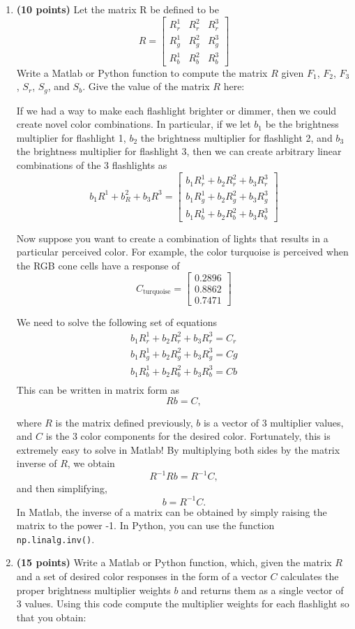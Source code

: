 \documentclass[10pt,letterpaper]{article}
\newcommand{\cmd}[1] {{\color{blue}\texttt{#1}}}
\begin{document}
\begin{enumerate}
\item \textbf{(10 points)} Let the matrix R be defined to be 
\[
	R = \left[ \begin{array}{ccc}
				R^1_r &  R^2_r & R^3_r\\
				R^1_g &  R^2_g & R^3_g\\
				R^1_b &  R^2_b & R^3_b\end{array} \right]
\]
Write a Matlab or Python function to compute the matrix $R$ given $F_1$, $F_2$, $F_3$, $S_r$, $S_g$, and $S_b$. Give the value of the matrix $R$ here:
\vspace{2in}

If we had a way to make each flashlight brighter or dimmer, then we could
create novel color combinations. In particular, if we let $b_1$ be the brightness
multiplier for flashlight 1, $b_2$ the brightness multiplier for flashlight 2, and $b_3$ the brightness multiplier for flashlight 3, then we can create arbitrary linear
combinations of the 3 flashlights as
\[
	b_1R^1 + b_R^2 + b_3R^3 = \left[ \begin{array}{c}
				b_1R^1_r + b_2R^2_r + b_3R^3_r\\
				b_1R^1_g + b_2R^2_g + b_3R^3_g\\				
				b_1R^1_b + b_2R^2_b + b_3R^3_b\end{array} \right]
\]

Now suppose you want to create a combination of lights that results in a
particular perceived color. For example, the color turquoise is perceived when
the RGB cone cells have a response of
\[
C_{\text{turquoise}} = \left[ \begin{array}{c} 0.2896 \\ 0.8862 \\ 0.7471 \end{array} \right]
\]

We need to solve the following set of equations
\begin{eqnarray*}
b_1R^1_r + b_2R^2_r + b_3R^3_r = C_r\\
b_1R^1_g + b_2R^2_g + b_3R^3_g = Cg \\
b_1R^1_b + b_2R^2_b + b_3R^3_b = Cb \\
\end{eqnarray*}
This can be written in matrix form as
\[ Rb = C, \]

where $R$ is the matrix defined previously, $b$ is a vector of 3 multiplier values, and $C$ is the 3 color components for the desired color. Fortunately, this is extremely easy to solve in Matlab! By multiplying both sides by the matrix inverse of $R$, we obtain
\[ R^{-1}Rb = R^{-1}C, \]
and then simplifying,
\[ b = R^{-1}C. \]
In Matlab, the inverse of a matrix can be obtained by simply raising the matrix to the power -1.
In Python, you can use the function \cmd{np.linalg.inv()}.
\item \textbf{(15 points)} Write a Matlab or Python function, which, given the matrix $R$ and a
set of desired color responses in the form of a vector $C$ calculates the proper
brightness multiplier weights $b$ and returns them as a single vector of 3 values. Using this code compute the multiplier weights for each flashlight so that you  obtain:


\end{enumerate}
\end{document}
